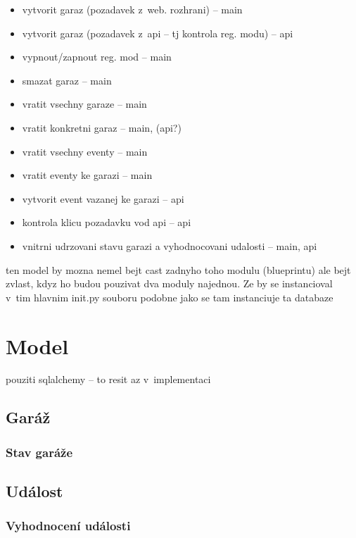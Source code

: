 \begin{itemize}
    \item vytvorit garaz (pozadavek z~web. rozhrani) -- main
    \item vytvorit garaz (pozadavek z~api -- tj kontrola reg. modu) -- api
    \item vypnout/zapnout reg. mod -- main
    \item smazat garaz -- main
    \item vratit vsechny garaze -- main
    \item vratit konkretni garaz -- main, (api?)
    \item vratit vsechny eventy -- main
    \item vratit eventy ke garazi -- main
    \item vytvorit event vazanej ke garazi -- api
    \item kontrola klicu pozadavku vod api -- api
    \item vnitrni udrzovani stavu garazi a vyhodnocovani udalosti -- main, api
\end{itemize}

ten model by mozna nemel bejt cast zadnyho toho modulu (blueprintu) ale bejt zvlast, kdyz ho budou pouzivat dva moduly najednou. Ze by se instancioval v~tim hlavnim init.py souboru podobne jako se tam instanciuje ta databaze

\section{Model}

pouziti sqlalchemy -- to resit az v~implementaci

\subsection{Garáž}

\subsubsection{Stav garáže}

\subsection{Událost}

\subsubsection{Vyhodnocení události}

